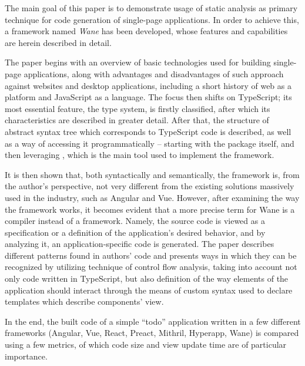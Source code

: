 The main goal of this paper is to demonstrate usage of static analysis as primary technique for code generation of single-page applications.
In order to achieve this, a framework named \textit{Wane} has been developed, whose features and capabilities are herein described in detail.

The paper begins with an overview of basic technologies used for building single-page applications, along with advantages and disadvantages of such approach against websites and desktop applications, including a short history of web as a platform and JavaScript as a language.
The focus then shifts on TypeScript; its most essential feature, the type system, is firstly classified, after which its characteristics are described in greater detail.
After that, the structure of abstract syntax tree which corresponds to TypeScript code is described, as well as a way of accessing it programmatically -- starting with the package  itself, and then leveraging , which is the main tool used to implement the framework.

It is then shown that, both syntactically and semantically, the framework is, from the author's perspective, not very different from the existing solutions massively used in the industry, such as Angular and Vue.
However, after examining the way the framework works, it becomes evident that a more precise term for Wane is a compiler instead of a framework.
Namely, the source code is viewed as a specification or a definition of the application's desired behavior, and by analyzing it, an application-specific code is generated.
The paper describes different patterns found in authors' code and presents ways in which they can be recognized by utilizing technique of control flow analysis, taking into account not only code written in TypeScript, but also definition of the way elements of the application should interact through the means of custom syntax used to declare templates which describe components' view.

In the end, the built code of a simple ``todo'' application written in a few different frameworks (Angular, Vue, React, Preact, Mithril, Hyperapp, Wane) is compared using a few metrics, of which code size and view update time are of particular importance.
